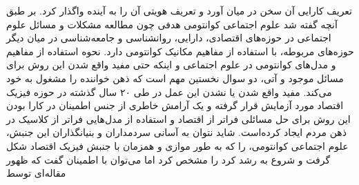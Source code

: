 \documentclass[a4paper,titlepage,12pt,fleqn,oneside]{report}
\begin{document}
	تعریف کارایی آن سخن در میان آورد و تعریف هویتی آن را به آینده واگذار کرد. بر طبق آنچه گفته شد علوم اجتماعی کوانتومی هدفی چون مطالعه مشکلات و مسائل علوم اجتماعی در حوزه‌های اقتصادی، دارایی، روانشناسی و جامعه‌شناسی در میان دیگر حوزه‌های مربوطه، با استفاده از مفاهیم مکانیک کوانتومی دارد. نحوه استفاده از مفاهیم و مدل‌های کوانتومی در علوم اجتماعی و اینکه حتی مفید واقع شدن این روش برای مسائل موجود و آتی، دو سوال نخستین مهم است که ذهن خواننده را مشغول به خود می‌کند. مفید واقع شدن یا نشدن این عمل در طی ۲۰ سال گذشته در حوزه فیزیک اقتصاد مورد آزمایش قرار گرفته و یک آرامش خاطری از جنس اطمینان در کارا بودن این روش برای حل مسائلی فراتر از اقتصاد و استفاده از مدل‌هایی فراتر از کلاسیک در ذهن مردم ایجاد کرده‌است. شاید نتوان به آسانی سردمداران و بنیانگذاران این جنبش، علوم اجتماعی کوانتومی، را که به طور موازی و همزمان با جنبش فیزیک اقتصاد شکل گرفت و شروع به رشد کرد را مشخص کرد اما می‌توان با اطمینان گفت که ظهور مقاله‌ای\cite{kh2} توسط 
\end{document}
